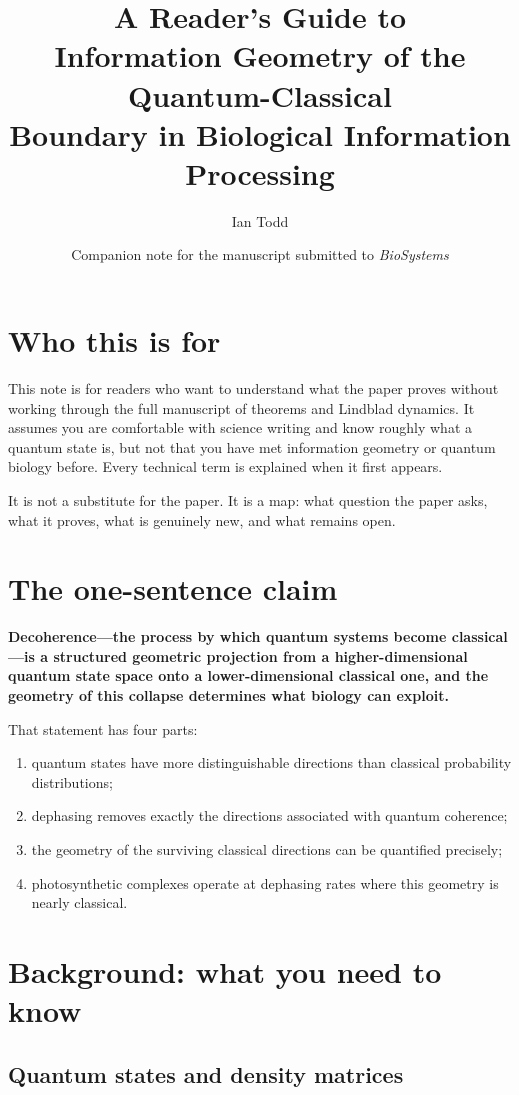\documentclass[11pt,a4paper]{article}
\title{\textbf{A Reader's Guide to\\Information Geometry of the Quantum-Classical\\Boundary in Biological Information Processing}}
\author{Ian Todd}
\date{Companion note for the manuscript submitted to \emph{BioSystems}}
\begin{document}
\maketitle

\section*{Who this is for}

This note is for readers who want to understand what the paper proves without working through the full manuscript of theorems and Lindblad dynamics.  It assumes you are comfortable with science writing and know roughly what a quantum state is, but not that you have met information geometry or quantum biology before.  Every technical term is explained when it first appears.

It is not a substitute for the paper.  It is a map: what question the paper asks, what it proves, what is genuinely new, and what remains open.

\section*{The one-sentence claim}

\textbf{Decoherence---the process by which quantum systems become classical---is a structured geometric projection from a higher-dimensional quantum state space onto a lower-dimensional classical one, and the geometry of this collapse determines what biology can exploit.}

That statement has four parts:
\begin{enumerate}[leftmargin=1.5em]
\item quantum states have more distinguishable directions than classical probability distributions;
\item dephasing removes exactly the directions associated with quantum coherence;
\item the geometry of the surviving classical directions can be quantified precisely;
\item photosynthetic complexes operate at dephasing rates where this geometry is nearly classical.
\end{enumerate}

\section*{Background: what you need to know}

\subsection*{Quantum states and density matrices}
\end{document}
